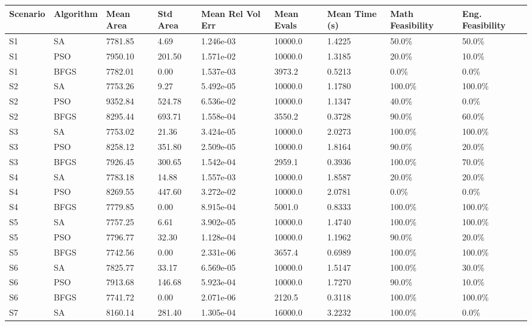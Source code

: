 \begin{table}[H]
\centering
\small
\setlength{\tabcolsep}{6pt}
\begin{tabular}{lllllllll}
\toprule
Scenario & Algorithm & Mean Area & Std Area & Mean Rel Vol Err & Mean Evals & Mean Time (s) & Math Feasibility & Eng. Feasibility \\
\midrule
S1 & SA & 7781.85 & 4.69 & 1.246e-03 & 10000.0 & 1.4225 & 50.0\% & 50.0\% \\
S1 & PSO & 7950.10 & 201.50 & 1.571e-02 & 10000.0 & 1.3185 & 20.0\% & 10.0\% \\
S1 & BFGS & 7782.01 & 0.00 & 1.537e-03 & 3973.2 & 0.5213 & 0.0\% & 0.0\% \\
S2 & SA & 7753.26 & 9.27 & 5.492e-05 & 10000.0 & 1.1780 & 100.0\% & 100.0\% \\
S2 & PSO & 9352.84 & 524.78 & 6.536e-02 & 10000.0 & 1.1347 & 40.0\% & 0.0\% \\
S2 & BFGS & 8295.44 & 693.71 & 1.558e-04 & 3550.2 & 0.3728 & 90.0\% & 60.0\% \\
S3 & SA & 7753.02 & 21.36 & 3.424e-05 & 10000.0 & 2.0273 & 100.0\% & 100.0\% \\
S3 & PSO & 8258.12 & 351.80 & 2.509e-05 & 10000.0 & 1.8164 & 90.0\% & 20.0\% \\
S3 & BFGS & 7926.45 & 300.65 & 1.542e-04 & 2959.1 & 0.3936 & 100.0\% & 70.0\% \\
S4 & SA & 7783.18 & 14.88 & 1.557e-03 & 10000.0 & 1.8587 & 20.0\% & 20.0\% \\
S4 & PSO & 8269.55 & 447.60 & 3.272e-02 & 10000.0 & 2.0781 & 0.0\% & 0.0\% \\
S4 & BFGS & 7779.85 & 0.00 & 8.915e-04 & 5001.0 & 0.8333 & 100.0\% & 100.0\% \\
S5 & SA & 7757.25 & 6.61 & 3.902e-05 & 10000.0 & 1.4740 & 100.0\% & 100.0\% \\
S5 & PSO & 7796.77 & 32.30 & 1.128e-04 & 10000.0 & 1.1962 & 90.0\% & 20.0\% \\
S5 & BFGS & 7742.56 & 0.00 & 2.331e-06 & 3657.4 & 0.6989 & 100.0\% & 100.0\% \\
S6 & SA & 7825.77 & 33.17 & 6.569e-05 & 10000.0 & 1.5147 & 100.0\% & 30.0\% \\
S6 & PSO & 7913.68 & 146.68 & 5.923e-04 & 10000.0 & 1.7270 & 90.0\% & 10.0\% \\
S6 & BFGS & 7741.72 & 0.00 & 2.071e-06 & 2120.5 & 0.3118 & 100.0\% & 100.0\% \\
S7 & SA & 8160.14 & 281.40 & 1.305e-04 & 16000.0 & 3.2232 & 100.0\% & 0.0\% \\

\end{tabular}
\end{table}
